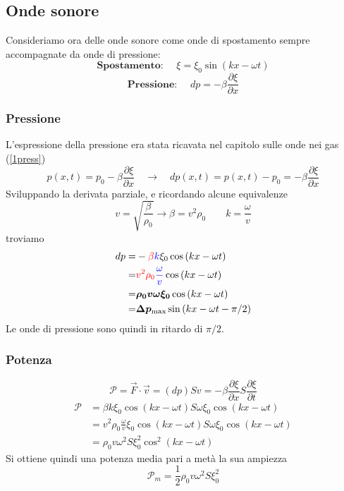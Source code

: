 \documentclass[x11names]{article}
\begin{document}
	\subsection{Onde sonore}\label{Onde Sonore}
	Consideriamo ora delle onde sonore come onde di spostamento sempre accompagnate da onde di pressione:
	\[ 
	\textbf{Spostamento: }\quad \xi = \xi _0\sin(kx-\omega t)
	\]
	\[ 
	\textbf{Pressione: }\quad dp = -\beta \frac{\partial\xi}{\partial x}
	\]
	\subsubsection{Pressione}
	L'espressione della pressione era stata ricavata nel capitolo sulle onde nei gas (\ref{1press})
	\[ 
	p(x,t) = p_0 -\beta \frac{\partial \xi }{\partial x} \quad \to \quad dp(x,t) = p(x,t) - p_0 = -\beta \frac{\partial \xi }{\partial x}
	\]
	Sviluppando la derivata parziale, e ricordando alcune equivalenze
	\[ 
	\boxed{v = \sqrt{\frac{\beta}{\rho_0}} \to  \beta = v^2\rho_0} \qquad \boxed{k = \frac{\omega }{v}}
	\]
	troviamo
	\begin{align*}
		dp =& -\textcolor{red}{\beta} \textcolor{blue}{k} \xi_0 \cos\left(kx-\omega t\right) \\
		   =& \textcolor{red}{v^2 \rho_0}\textcolor{blue}{\frac{\omega }{v}} \cos\left(kx-\omega t\right) \\
		   =& \boldsymbol{\rho_0 v \omega  \xi_0}  \cos\left(kx-\omega t\right) \\ 
		   =& \boldsymbol{\Delta p_{\text{max}}} \sin\left(kx -\omega t - \pi /2\right) \\
	\end{align*}
	Le onde di pressione sono quindi in ritardo di \(\pi /2\).
	
	\subsubsection{Potenza}
	\[ 
	\mathcal{P} = \overrightarrow{F}\cdot \vec{v} = (dp)S v = -\beta \frac{\partial\xi}{\partial x} S \frac{\partial\xi}{\partial t}
	\]
	\begin{align*}
		\mathcal{P} &= \beta k \xi_0 \cos\left(kx- \omega t\right) S \omega  \xi_0 \cos\left(kx- \omega t\right)\\
					&= v^2\rho_0 \frac{\omega}{v} \xi_0 \cos\left(kx- \omega t\right) S \omega \xi_0 \cos\left(kx- \omega t\right)\\
					&=  \rho_0 v \omega ^2 S \xi_0^2 \cos^2\left(kx- \omega t\right) 
	\end{align*}
	Si ottiene quindi una potenza media pari a metà la sua ampiezza
	\[ 
	\mathcal{P}_m = \frac{1}{2} \rho_0 v \omega ^2 S \xi_0^2
	\]
\end{document}
